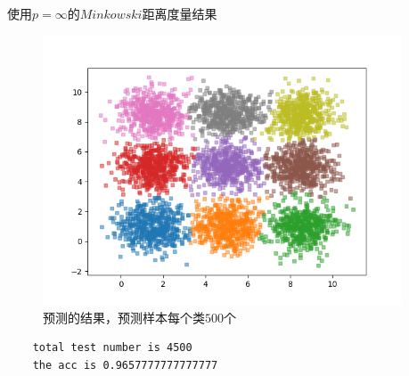 \documentclass{article}
\begin{document}
使用$p=\infty$的$Minkowski$距离度量结果
\begin{figure}[H]
    \centering
    \begin{minipage}[t]{1.0\linewidth}
        \centering
        \includegraphics[height=8cm]{normal_inf.png}
        \caption{预测的结果，预测样本每个类$500$个}
    \end{minipage}
 \end{figure}
 \begin{verbatim}
    total test number is 4500
    the acc is 0.9657777777777777
    \end{verbatim}
\end{document}
